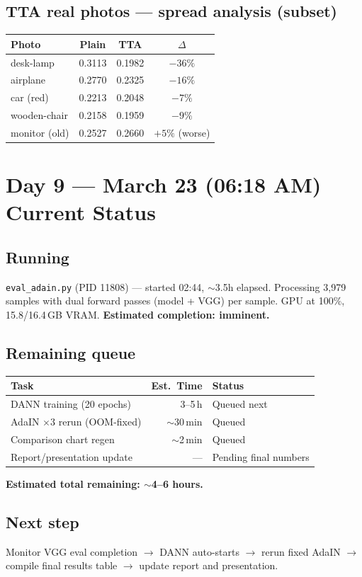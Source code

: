 \documentclass[10pt,a4paper]{article}
\begin{document}
\subsection*{TTA real photos --- spread analysis (subset)}
\begin{center}
\begin{tabular}{lccc}
\toprule
\textbf{Photo} & \textbf{Plain} & \textbf{TTA} & \textbf{$\Delta$} \\
\midrule
desk-lamp & 0.3113 & 0.1982 & $-36\%$ \\
airplane & 0.2770 & 0.2325 & $-16\%$ \\
car (red) & 0.2213 & 0.2048 & $-7\%$ \\
wooden-chair & 0.2158 & 0.1959 & $-9\%$ \\
monitor (old) & 0.2527 & 0.2660 & $+5\%$ (worse) \\
\bottomrule
\end{tabular}
\end{center}

\section*{Day 9 --- March 23 (06:18 AM) \hfill \normalfont\small\textcolor{running}{Current Status}}

\subsection*{Running}
\texttt{eval\_adain.py} (PID 11808) --- started 02:44, $\sim$3.5h elapsed. Processing 3,979 samples with dual forward passes (model + VGG) per sample. GPU at 100\%, 15.8/16.4\,GB VRAM. \textbf{Estimated completion: imminent.}

\subsection*{Remaining queue}
\begin{center}
\begin{tabular}{lrl}
\toprule
\textbf{Task} & \textbf{Est.\ Time} & \textbf{Status} \\
\midrule
DANN training (20 epochs) & 3--5\,h & Queued next \\
AdaIN $\times 3$ rerun (OOM-fixed) & $\sim$30\,min & Queued \\
Comparison chart regen & $\sim$2\,min & Queued \\
Report/presentation update & --- & Pending final numbers \\
\bottomrule
\end{tabular}
\end{center}

\textbf{Estimated total remaining: $\sim$4--6 hours.}

\subsection*{Next step}
Monitor VGG eval completion $\to$ DANN auto-starts $\to$ rerun fixed AdaIN $\to$ compile final results table $\to$ update report and presentation.
\end{document}
